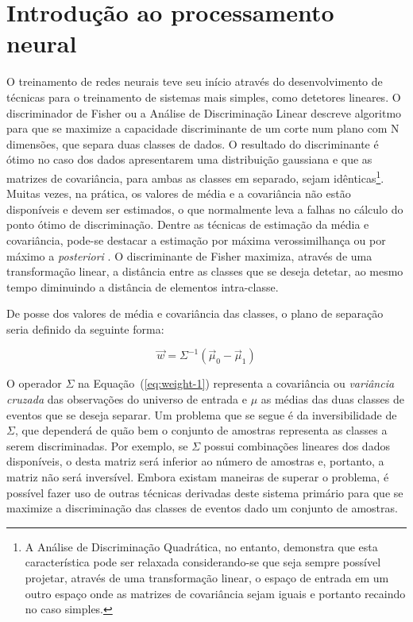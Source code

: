 \typeout{ ====================================================================}
\typeout{ ====================================================================}

\chapter{Introdução ao processamento neural}
\label{ap:rna}

O treinamento de redes neurais teve seu início através do desenvolvimento de
técnicas para o treinamento de sistemas mais simples, como detetores lineares.
O discriminador de Fisher \cite{fisher} ou a Análise de Discriminação Linear
descreve algoritmo para que se maximize a capacidade discriminante de um corte
num plano com N dimensões, que separa duas classes de dados. O resultado do
discriminante é ótimo no caso dos dados apresentarem uma distribuição
gaussiana e que as matrizes de covariância, para ambas as classes em separado,
sejam idênticas\footnote{A Análise de Discriminação Quadrática, no entanto,
demonstra que esta característica pode ser relaxada considerando-se que seja
sempre possível projetar, através de uma transformação linear, o espaço de
entrada em um outro espaço onde as matrizes de covariância sejam iguais e
portanto recaindo no caso simples.}. Muitas vezes, na prática, os valores de
média e a covariância não estão disponíveis e devem ser estimados, o que
normalmente leva a falhas no cálculo do ponto ótimo de discriminação. Dentre
as técnicas de estimação da média e covariância, pode-se destacar a estimação
por máxima verossimilhança ou por máximo a \textit{posteriori} \cite{duda}. O
discriminante de Fisher maximiza, através de uma transformação linear, a
distância entre as classes que se deseja detetar, ao mesmo tempo diminuindo a
distância de elementos intra-classe.

De posse dos valores de média e covariância das classes, o plano de separação
seria definido da seguinte forma:

\begin{equation}
\overrightarrow{w} = \Sigma^{-1}(\overrightarrow{\mu}_0 -
\overrightarrow{\mu}_1) 
\label{eq:weight-1}
\end{equation}

O operador $\Sigma$ na Equação~(\ref{eq:weight-1}) representa a covariância ou
\textit{variância cruzada} das observações do universo de entrada e $\mu$ as
médias das duas classes de eventos que se deseja separar. Um problema que se
segue é da inversibilidade de $\Sigma$, que dependerá de quão bem o conjunto
de amostras representa as classes a serem discriminadas. Por exemplo, se
$\Sigma$ possui combinações lineares dos dados disponíveis, o  desta
matriz será inferior ao número de amostras e, portanto, a matriz não será
inversível. Embora existam maneiras de superar o problema, é possível fazer
uso de outras técnicas derivadas deste sistema primário para que se maximize a
discriminação das classes de eventos dado um conjunto de amostras.

